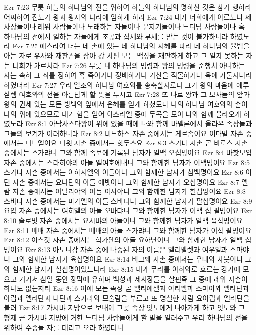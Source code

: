 Ezr 7:23  무릇 하늘의 하나님의 전을 위하여 하늘의 하나님의 명하신 것은 삼가 행하라 어찌하여 진노가 왕과 왕자의 나라에 임하게 하랴
Ezr 7:24  내가 너희에게 이르노니 제사장들이나 레위 사람들이나 노래하는 자들이나 문지기들이나 느디님 사람들이나 혹 하나님의 전에서 일하는 자들에게 조공과 잡세와 부세를 받는 것이 불가하니라 하였노라
Ezr 7:25  에스라여 너는 네 손에 있는 네 하나님의 지혜를 따라 네 하나님의 율법을 아는 자로 유사와 재판관을 삼아 강 서편 모든 백성을 재판하게 하고 그 알지 못하는 자는 너희가 가르치라
Ezr 7:26  무릇 네 하나님의 명령과 왕의 명령을 준행치 아니하는 자는 속히 그 죄를 정하여 혹 죽이거나 정배하거나 가산을 적몰하거나 옥에 가둘지니라 하였더라
Ezr 7:27  우리 열조의 하나님 여호와를 송축할지로다 그가 왕의 마음에 예루살렘 여호와의 전을 아름답게 할 뜻을 두시고
Ezr 7:28  또 나로 왕과 그 모사들의 앞과 왕의 권세 있는 모든 방백의 앞에서 은혜를 얻게 하셨도다 나의 하나님 여호와의 손이 나의 위에 있으므로 내가 힘을 얻어 이스라엘 중에 두목을 모아 나와 함께 올라오게 하였노라
Ezr 8:1  아닥사스다왕이 위에 있을 때에 나와 함께 바벨론에서 올라온 족장들과 그들의 보계가 이러하니라
Ezr 8:2  비느하스 자손 중에서는 게르솜이요 이다말 자손 중에서는 다니엘이요 다윗 자손 중에서는 핫두스요
Ezr 8:3  스가냐 자손 곧 바로스 자손 중에서는 스가랴니 그와 함께 족보에 기록된 남자가 일백 오십명이요
Ezr 8:4  바핫모압 자손 중에서는 스라히야의 아들 엘여호에내니 그와 함께한 남자가 이백명이요
Ezr 8:5  스가냐 자손 중에서는 야하시엘의 아들이니 그와 함께한 남자가 삼백명이요
Ezr 8:6  아딘 자손 중에서는 요나단의 아들 에벳이니 그와 함께한 남자가 오십명이요
Ezr 8:7  엘람 자손 중에서는 아달리야의 아들 여사야니 그와 함께한 남자가 칠십명이요
Ezr 8:8  스바댜 자손 중에서는 미가엘의 아들 스바댜니 그와 함께한 남자가 팔십명이요
Ezr 8:9  요압 자손 중에서는 여히엘의 아들 오바댜니 그와 함께한 남자가 이백 십 팔명이요
Ezr 8:10  슬로밋 자손 중에서는 요시뱌의 아들이니 그와 함께한 남자가 일백 육십명이요
Ezr 8:11  베배 자손 중에서는 베배의 아들 스가랴니 그와 함께한 남자가 이십 팔명이요
Ezr 8:12  아스갓 자손 중에서는 학가단의 아들 요하난이니 그와 함께한 남자가 일백 십명이요
Ezr 8:13  아도니감 자손 중에 나중된 자의 이름은 엘리벨렛과 여우엘과 스마야니 그와 함께한 남자가 육십명이요
Ezr 8:14  비그왜 자손 중에서는 우대와 사붓이니 그와 함께한 남자가 칠십명이었느니라
Ezr 8:15  내가 무리를 아하와로 흐르는 강가에 모으고 거기서 삼일 동안 장막에 유하며 백성과 제사장들을 살핀즉 그 중에 레위 자손이 하나도 없는지라
Ezr 8:16  이에 모든 족장 곧 엘리에셀과 아리엘과 스마야와 엘라단과 야립과 엘라단과 나단과 스가랴와 므술람을 부르고 또 명철한 사람 요야립과 엘라단을 불러
Ezr 8:17  가시뱌 지방으로 보내어 그곳 족장 잇도에게 나아가게 하고 잇도와 그 형제 곧 가시뱌 지방에 거한 느디님 사람들에게 할 말을 일러주고 우리 하나님의 전을 위하여 수종들 자를 데리고 오라 하였더니
